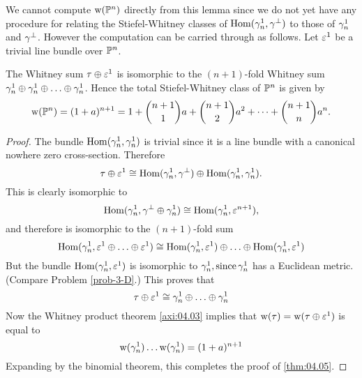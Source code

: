 \documentclass[../main]{subfiles}
\begin{document}
We cannot compute $\operatorname{w}(\mathbb{P}^n)$ directly from this lemma since we do not yet have any procedure for relating the Stiefel-Whitney classes of $\operatorname{Hom}(\gamma_n^1, \gamma^{\perp})$ to those of $\gamma_n^1$ and $\gamma^{\perp}$. However the computation can be carried through as follows. Let $\varepsilon^1$ be a trivial line bundle over $\mathbb{P}^{n}$.

\begin{theorem}
\label{thm:04.05}
The Whitney sum $\tau \oplus \varepsilon^{1}$ is isomorphic to the $(n+1)$-fold Whitney sum $\gamma_{n}^{1} \oplus \gamma_{n}^{1} \oplus \ldots \oplus \gamma_{n}^{1}$. Hence the total Stiefel-Whitney class of $\mathbb{P}^{n}$ is given by
\[
\operatorname{w}(\mathbb{P}^{n})=(1+a)^{n+1}=1+\binom{n+1}{1}a + \binom{n+1}{2}a^2 + \dots + \binom{n+1}{n}a^{n} .
\]
\end{theorem}

\begin{proof}
The bundle $\operatorname{Hom}(\gamma_{n}^{1}, \gamma_{n}^{1})$  is trivial since it is a line bundle with a canonical nowhere zero cross-section. Therefore
\[
\tau \oplus \varepsilon^{1} \cong \operatorname{Hom}(\gamma_{n}^{1}, \gamma^{\perp}) \oplus \operatorname{Hom}(\gamma_{n}^{1}, \gamma_{n}^{1}) .
\]
This is clearly isomorphic to
\[
\operatorname{Hom}(\gamma_{n}^{1}, \gamma^{\perp} \oplus \gamma_{n}^{1}) \cong \operatorname{Hom}(\gamma_{n}^{1}, \varepsilon^{n+1}),
\]
and therefore is isomorphic to the $(n+1)$-fold sum
\[
\operatorname{Hom}(\gamma_{n}^{1}, \varepsilon^{1} \oplus \ldots \oplus \varepsilon^{1}) \cong \operatorname{Hom}(\gamma_{n}^{1}, \varepsilon^{1}) \oplus \ldots \oplus \operatorname{Hom}(\gamma_{n}^{1}, \varepsilon^{1})
\]
But the bundle $\operatorname{Hom}(\gamma_{n}^{1}, \varepsilon^{1})$ is isomorphic to $\gamma_{n}^{1}, \operatorname{since} \gamma_{n}^{1}$ has a Euclidean metric. (Compare Problem \ref{prob-3-D}.) This proves that
\[
\tau \oplus \varepsilon^{1} \cong \gamma_{n}^{1} \oplus \ldots \oplus \gamma_{n}^{1}
\]
Now the Whitney product theorem \ref{axi:04.03} implies that $\operatorname{w}(\tau)=\operatorname{w}(\tau \oplus \varepsilon^{1})$ is equal to
\[
\operatorname{w}(\gamma_{n}^{1}) \ldots \operatorname{w}(\gamma_{n}^{1})=(1+a)^{n+1}
\]
Expanding by the binomial theorem, this completes the proof of \ref{thm:04.05}.

\end{proof}
\end{document}
